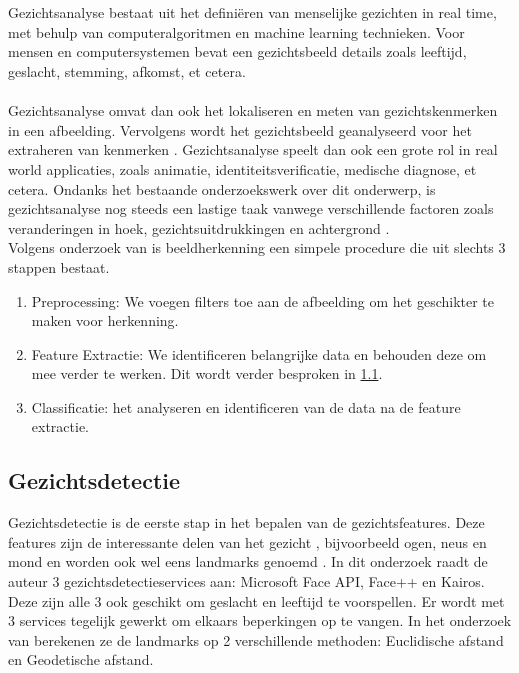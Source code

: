 \chapter{}%
\label{ch:standvanzaken}

Gezichtsanalyse bestaat uit het definiëren van menselijke gezichten in real time, met behulp van computeralgoritmen en machine learning technieken. Voor mensen en computersystemen bevat een gezichtsbeeld details zoals leeftijd, geslacht, stemming, afkomst, et cetera. \\
\\ 
Gezichtsanalyse omvat dan ook het lokaliseren en meten van gezichtskenmerken in een afbeelding. Vervolgens wordt het gezichtsbeeld geanalyseerd voor het extraheren van kenmerken \autocite{Sanil2023}. Gezichtsanalyse speelt dan ook een grote rol in real world applicaties, zoals animatie, identiteitsverificatie, medische diagnose, et cetera. Ondanks het bestaande onderzoekswerk over dit onderwerp, is gezichtsanalyse nog steeds een lastige taak vanwege verschillende factoren zoals veranderingen in hoek, gezichtsuitdrukkingen en achtergrond \autocite{Siddiqi2022}. \\

Volgens onderzoek van \textcite{Basystiuk2023} is beeldherkenning een simpele procedure die uit slechts 3 stappen bestaat. 
\begin{enumerate}
    \item Preprocessing: We voegen filters toe aan de afbeelding om het geschikter te maken voor herkenning.
    \item Feature Extractie: We identificeren belangrijke data en behouden deze om mee verder te werken. Dit wordt verder besproken in \ref{sub:gezichtsdetectie}.
    \item Classificatie: het analyseren en identificeren van de data na de feature extractie.
\end{enumerate}


\section{Gezichtsdetectie}\label{sub:gezichtsdetectie}
Gezichtsdetectie is de eerste stap in het bepalen van de gezichtsfeatures. Deze features zijn de interessante delen van het gezicht , bijvoorbeeld ogen, neus en mond en worden ook wel eens landmarks genoemd \autocite{Coppens2018}. In dit onderzoek raadt de auteur 3 gezichtsdetectieservices aan: Microsoft Face API, Face++ en Kairos. Deze zijn alle 3 ook geschikt om geslacht en leeftijd te voorspellen. Er wordt met 3 services tegelijk gewerkt om elkaars beperkingen op te vangen.
In het onderzoek van \textcite{Sanil2023} berekenen ze de landmarks op 2 verschillende methoden: Euclidische afstand en Geodetische afstand. \\

